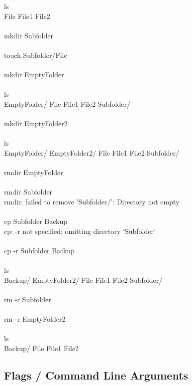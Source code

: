 \begin{bash}
\userprompt[~/Folder] ls\\
File  File1  File2\\
\\
\userprompt[~/Folder] mkdir Subfolder\\
\\
\userprompt[~/Folder] touch Subfolder/File\\
\\
\userprompt[~/Folder] mkdir EmptyFolder\\
\\
\userprompt[~/Folder] ls\\
EmptyFolder/  File  File1  File2  Subfolder/\\
\\
\userprompt[~/Folder] mkdir EmptyFolder2\\
\\
\userprompt[~/Folder] ls\\
EmptyFolder/  EmptyFolder2/  File  File1  File2  Subfolder/\\
\\
\userprompt[~/Folder] rmdir EmptyFolder\\
\\
\userprompt[~/Folder] rmdir Subfolder\\
rmdir: failed to remove 'Subfolder/': Directory not empty\\
\\
\userprompt[~/Folder] cp Subfolder Backup\\
cp: -r not specified; omitting directory 'Subfolder'\\
\\
\userprompt[~/Folder] cp -r Subfolder Backup\\
\\
\userprompt[~/Folder] ls\\
Backup/  EmptyFolder2/  File  File1  File2  Subfolder/\\
\\
\userprompt[~/Folder] rm -r Subfolder\\
\\
\userprompt[~/Folder] rm -r EmptyFolder2\\
\\
\userprompt[~/Folder] ls\\
Backup/  File  File1  File2\\
\end{bash}

\subsection{Flags / Command Line Arguments}\label{flags-command-line-arguments}

